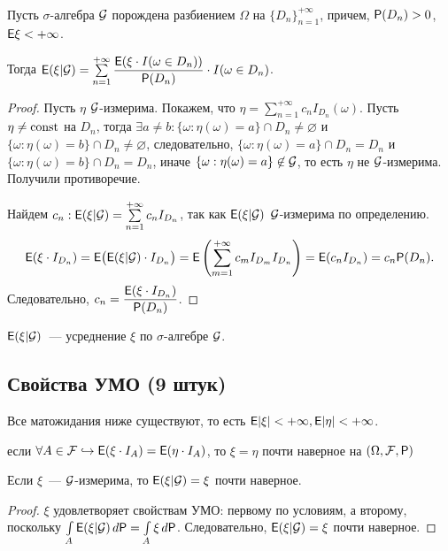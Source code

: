 \begin{theorem}~

	Пусть $\sigma$-алгебра $\G$ порождена разбиением $\Omega$ на $\{ D_n \}_{n = 1}^{+\infty}$, причем, $\P(D_n) > 0$, $\E \xi < +\infty$.
	
	Тогда $\E(\xi | \G ) = \sum\limits_{n=1}^{+\infty} \dfrac{\E ( \xi \cdot I(\omega \in D_n) )}{\P(D_n)} \cdot I(\omega \in D_n) $.
	\begin{proof}
		Пусть $\eta$ $\G$-измерима. Покажем, что $\eta = \sum\limits_{n=1}^{+\infty} c_n I_{D_n}(\omega)$. Пусть $\eta \not=\const$ на $D_n$, тогда $\exists a \not= b: \{\omega: \eta(\omega) = a \} \cap D_n \not= \varnothing$ и $\{\omega: \eta(\omega) = b \} \cap D_n \not= \varnothing$, следовательно, $\{\omega: \eta(\omega) = a \} \cap D_n = D_n$ и $\{\omega: \eta(\omega) = b \} \cap D_n = D_n$, иначе $\{\omega: \eta(\omega) = a \} \not\in \G$, то есть $\eta$ не $\G$-измерима. Получили противоречие.
		
		Найдем $c_n: \E( \xi | \G) = \sum\limits_{n=1}^{+\infty} c_n I_{D_n}$, так как $\E(\xi | \G)$ $\G$-измерима по определению. 
		\begin{equation*}
			\E (\xi \cdot I_{D_n} ) = \E \big( \E( \xi | \G ) \cdot I_{D_n} \big) = \E \left( \sum\limits_{m=1}^{+\infty} c_m I_{D_m} I_{D_n} \right) = \E( c_n I_{D_n} ) = c_n \P(D_n).
		\end{equation*}
		Следовательно, $c_n = \dfrac{\E(\xi \cdot I_{D_n} )}{\P(D_n)}$.
	\end{proof}
\end{theorem}

\begin{statement}
$\E(\xi|\G )$~--- усреднение $\xi$ по $\sigma$-алгебре $\G$.
\end{statement}

\subsection{Свойства УМО (9 штук)}
Все матожидания ниже существуют, то есть $\E|\xi| <+\infty, \E|\eta| <+\infty$.

\setcounter{property}{0}
 если $\forall A \in \F \hookrightarrow \E(\xi \cdot I_A) = \E(\eta \cdot I_A)$, то $\xi = \eta$ почти наверное на $(\Omega, \F, \P)$

\begin{property}
	Если $\xi$~--- $\G$-измерима, то $\E(\xi | \G) = \xi$ почти наверное. 
	\begin{proof}
		$\xi$ удовлетворяет свойствам УМО: первому по условиям, а второму, поскольку $\int\limits_A \E(\xi|\G) \, d\P = \int\limits_A \xi \, d\P$. Следовательно, $\E(\xi | \G) = \xi$ почти наверное.  
	\end{proof}
\end{property}

